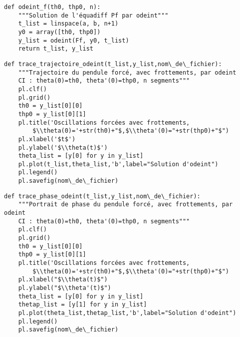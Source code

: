 \question{}
\begin{lstlisting}
def odeint_f(th0, thp0, n):
    """Solution de l'équadiff Pf par odeint"""
    t_list = linspace(a, b, n+1)
    y0 = array([th0, thp0])
    y_list = odeint(Ff, y0, t_list)
    return t_list, y_list
\end{lstlisting}

\question{}
\begin{lstlisting}
def trace_trajectoire_odeint(t_list,y_list,nom\_de\_fichier):
    """Trajectoire du pendule forcé, avec frottements, par odeint
    CI : theta(0)=th0, theta'(0)=thp0, n segments"""
    pl.clf()
    pl.grid()
    th0 = y_list[0][0]
    thp0 = y_list[0][1]
    pl.title('Oscillations forcées avec frottements, 
        $\\theta(0)='+str(th0)+"$,$\\theta'(0)="+str(thp0)+"$")
    pl.xlabel('$t$')
    pl.ylabel('$\\theta(t)$')
    theta_list = [y[0] for y in y_list]
    pl.plot(t_list,theta_list,'b',label="Solution d'odeint")
    pl.legend()
    pl.savefig(nom\_de\_fichier)
\end{lstlisting}

\question{}
\begin{lstlisting}
def trace_phase_odeint(t_list,y_list,nom\_de\_fichier):
    """Portrait de phase du pendule forcé, avec frottements, par odeint
    CI : theta(0)=th0, theta'(0)=thp0, n segments"""
    pl.clf()
    pl.grid()
    th0 = y_list[0][0]
    thp0 = y_list[0][1]
    pl.title('Oscillations forcées avec frottements, 
        $\\theta(0)='+str(th0)+"$,$\\theta'(0)="+str(thp0)+"$")
    pl.xlabel("$\\theta(t)$")
    pl.ylabel("$\\theta'(t)$")
    theta_list = [y[0] for y in y_list]
    thetap_list = [y[1] for y in y_list]
    pl.plot(theta_list,thetap_list,'b',label="Solution d'odeint")
    pl.legend()
    pl.savefig(nom\_de\_fichier) 
\end{lstlisting}
